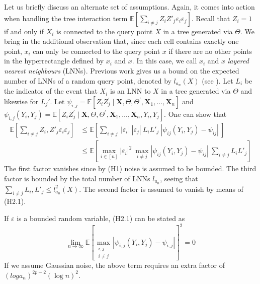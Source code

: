 \documentclass[10pt]{article}
\theoremstyle{definition}
\begin{document}
Let us briefly discuss an alternate set of
assumptions. Again, it comes into action when handling the tree interaction term
$\mathbb{E}\left[ \sum_{i\not= j} Z_{i} Z'_{j} \varepsilon_{i} \varepsilon_{j}
\right]$. Recall that $Z_{i} = 1$ if and only if $X_{i}$ is connected to the query point $X$ in
a tree generated via $\Theta$. We bring in the additional observation that,
since each cell contains exactly one point, $x_{i}$ can only be connected to the
query point $x$ if there are no other points in the hyperrectangle defined by
$x_i$ and $x$. In this case, we call $x_{i}$ and $x$ \textit{layered nearest
  neighbours} (LNNs). Previous work gives us a bound on the expected number of
LNNs of a random query point, denoted by $l_{a_{n}}(X)$ (see
\cite{scornet_ConsistencyRandomForests_2015}). Let $L_{i}$ be the indicator of
the event that $X_{i}$ is an LNN to $X$ in a tree generated via $\Theta$ and
likewise for $L_{j}'$. Let ${\psi_{i, j}=\mathbb{E}\left[Z_i Z_j^{\prime} \mid
    \mathbf{X}, \Theta, \Theta^{\prime}, \mathbf{X}_1, \ldots,
    \mathbf{X}_n\right]}$ and ${\psi_{i, j}\left(Y_i,
    Y_j\right)=\mathbb{E}\left[Z_i Z_j^{\prime} \mid \mathbf{X}, \Theta,
    \Theta^{\prime}, \mathbf{X}_1, \ldots, \mathbf{X}_n, Y_i, Y_j\right]}$. One
can show that
\begin{align*}
\mathbb{E}\left[ \sum_{i \not= j} Z_{i}, Z'_{j} \varepsilon_{i} \varepsilon_{j}
\right] & \leq \mathbb{E}\left[ \sum_{i \not= j} ~|\varepsilon_{i}|~
  |\varepsilon_{j}|~ L_{i} L'_{j} ~|\psi_{ij}(Y_{i}, Y_{j}) - \psi_{ij}|~ \right] \\
& \leq
\mathbb{E}\left[ \max_{i \in [n]} |\varepsilon_{i}|^2 ~ \max_{i \not= j}
  |\psi_{ij}(Y_{i}, Y_{j}) - \psi_{ij}| ~\sum_{i \not= j}  L_{i} L'_{j}\right]
\end{align*}
The first factor vanishes since by (H1) noise is assumed to be bounded. The
third factor is bounded by the total number of LNNs $l_{a_{n}}$, seeing that
$\sum_{i \not= j} L_{i}, L'_{j} \leq l_{a_{n}}^2(X)$. The second factor is assumed
to vanish by means of (H2.1).

\begin{mainhyp}[2.1] If $\varepsilon$ is a bounded random variable,
  (H2.1) can be stated as
  $$
  \lim _{n \rightarrow \infty} \mathbb{E}\left[\max _{\substack{i, j \\ i \neq
        j}}\left|\psi_{i, j}\left(Y_i, Y_j\right)-\psi_{i, j}\right|\right]^2=0
  $$
  If we assume Gaussian noise, the above term requires an extra factor of $(log a_n)^{2 p-2}(\log n)^2$.
\end{mainhyp}
\end{document}
